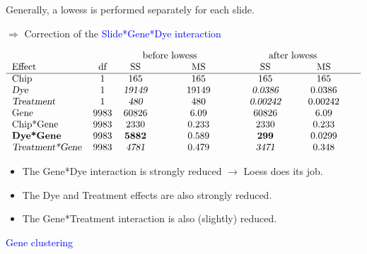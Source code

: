 \documentclass[dvips, lscape]{foils}
\newcommand{\textblue}[1]{\textcolor{blue}{#1}}
\newcommand{\chapter}[1]{
  \addtocounter{chapter}{1}
  \setcounter{section}{0}
  \setcounter{subsection}{0}
  {\centerline{\textblue{\LARGE #1}}}
  }
\newcommand{\subsection}[1]{
  \addtocounter{subsection}{1}
  {\noindent{\textblue{\large #1}}}
  }
\newcommand{\paragraph}[1]{\noindent{\textblue{#1}}}
\begin{document}
\paragraph{Lowess correction in a swap design.} 
Generally, a lowess is performed separately for each slide.
\centerline{$\Rightarrow$ Correction of the \textblue{Slide*Gene*Dye
    interaction}}
$$
  \begin{tabular}{lcccccc}
    & & \multicolumn{2}{l}{\qquad before lowess \qquad\qquad~} &
    \multicolumn{2}{l}{\qquad after lowess\qquad\qquad~} \\
    Effect & df & SS & MS & SS & MS \\
    \hline
    Chip & 1 & 165 & 165 & 165 & 165 \\ 
    {\sl Dye} & 1 & {\sl 19149} & 19149 & {\sl 0.0386} & 0.0386 \\ 
    {\sl Treatment} & 1 & {\sl 480} & 480 & {\sl 0.00242} & 0.00242 \\ 
    Gene & 9983 & 60826 & 6.09 & 60826 & 6.09 \\ 
    Chip*Gene & 9983 & 2330 & 0.233 & 2330 & 0.233 \\ 
    {\bf Dye*Gene} & 9983 & {\bf 5882} & 0.589 & {\bf 299} & 0.0299 \\ 
    {\sl Treatment*Gene} & 9983 & {\sl 4781} & 0.479 & {\sl 3471} & 0.348 \\ 
  \end{tabular} 
$$
\begin{itemize}
\item The Gene*Dye interaction is strongly reduced $\rightarrow$ Loess
  does its job.
\item The Dye and Treatment effects are also strongly reduced.
\item The Gene*Treatment interaction is also (slightly) reduced.
\end{itemize}

\newpage
\chapter{Gene clustering}

\subsection{Hierarchical clustering} 
\end{document}
